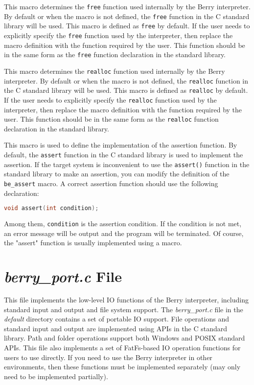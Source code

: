 
This macro determines the \texttt{free} function used internally by the Berry interpreter. By default or when the macro is not defined, the \texttt{free} function in the C standard library will be used. This macro is defined as \texttt{free} by default. If the user needs to explicitly specify the \texttt{free} function used by the interpreter, then replace the macro definition with the function required by the user. This function should be in the same form as the \texttt{free} function declaration in the standard library.


This macro determines the \texttt{realloc} function used internally by the Berry interpreter. By default or when the macro is not defined, the \texttt{realloc} function in the C standard library will be used. This macro is defined as \texttt{realloc} by default. If the user needs to explicitly specify the \texttt{realloc} function used by the interpreter, then replace the macro definition with the function required by the user. This function should be in the same form as the \texttt{realloc} function declaration in the standard library.


This macro is used to define the implementation of the assertion function. By default, the \texttt{assert} function in the C standard library is used to implement the assertion. If the target system is inconvenient to use the \texttt{assert()} function in the standard library to make an assertion, you can modify the definition of the \texttt{be\_assert} macro. A correct assertion function should use the following declaration:

\begin{lstlisting}[language=c, numbers=none]
void assert(int condition);
\end{lstlisting}

Among them, \texttt{condition} is the assertion condition. If the condition is not met, an error message will be output and the program will be terminated. Of course, the "assert" function is usually implemented using a macro.

\section{\textsl{berry\_port.c} File}

This file implements the low-level IO functions of the Berry interpreter, including standard input and output and file system support. The \textsl{berry\_port.c} file in the \textsl{default} directory contains a set of portable IO support. File operations and standard input and output are implemented using APIs in the C standard library. Path and folder operations support both Windows and POSIX standard APIs. This file also implements a set of FatFs-based IO operation functions for users to use directly. If you need to use the Berry interpreter in other environments, then these functions must be implemented separately (may only need to be implemented partially).

